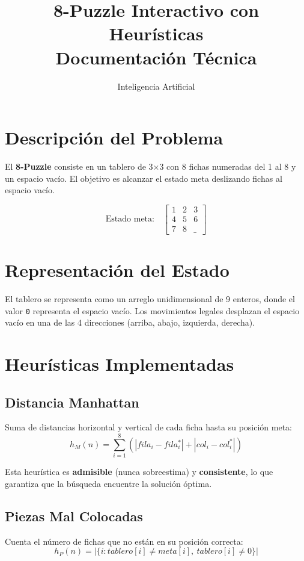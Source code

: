 \documentclass[12pt,a4paper]{article}
\title{\textbf{8-Puzzle Interactivo con Heurísticas}\\
  \large Documentación Técnica}
\author{Inteligencia Artificial}
\date{}
\begin{document}
\maketitle
\tableofcontents
\newpage

\section{Descripción del Problema}
El \textbf{8-Puzzle} consiste en un tablero de 3×3 con 8 fichas numeradas del 1 al 8 y un espacio vacío. El objetivo es alcanzar el estado meta deslizando fichas al espacio vacío.

\[
\text{Estado meta:}\quad
\begin{bmatrix} 1 & 2 & 3 \\ 4 & 5 & 6 \\ 7 & 8 & \_ \end{bmatrix}
\]

\section{Representación del Estado}

El tablero se representa como un arreglo unidimensional de 9 enteros, donde el valor \texttt{0} representa el espacio vacío. Los movimientos legales desplazan el espacio vacío en una de las 4 direcciones (arriba, abajo, izquierda, derecha).

\section{Heurísticas Implementadas}

\subsection{Distancia Manhattan}
Suma de distancias horizontal y vertical de cada ficha hasta su posición meta:
\[
h_M(n) = \sum_{i=1}^{8} \left(|fila_i - fila_i^*| + |col_i - col_i^*|\right)
\]

Esta heurística es \textbf{admisible} (nunca sobreestima) y \textbf{consistente}, lo que garantiza que la búsqueda encuentre la solución óptima.

\subsection{Piezas Mal Colocadas}
Cuenta el número de fichas que no están en su posición correcta:
\[
h_P(n) = |\{i : tablero[i] \neq meta[i],\ tablero[i] \neq 0\}|
\]
\end{document}
